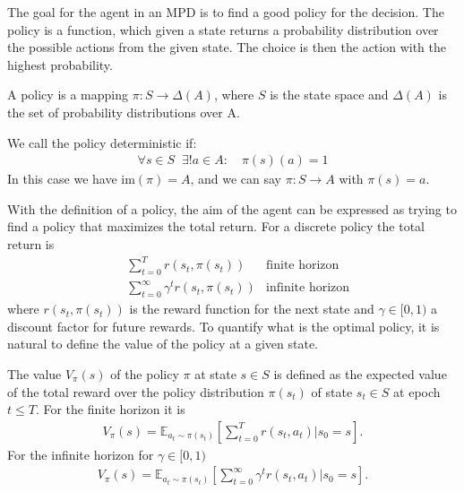 The goal for the agent in an MPD is to find a good policy for the decision.
The policy is a function, which given a state returns a probability
distribution over the possible actions from the given state. The choice is
then the action with the highest probability.
\begin{definition}[Policy]
    A policy is a mapping $\pi : S \to \Delta\left( A \right)$, where $S$ is
    the state space and $\Delta(A)$ is the set of probability distributions
    over A.
    \newline

    We call the policy deterministic if:
    \begin{align}
        \forall s \in S\;\; \exists !  a\in A:\quad \pi(s)(a) = 1
    \end{align}
    In this case we have $\text{im}(\pi) = A$, and we can say $\pi: S \to A$ with
    $\pi(s) = a$.
\end{definition}
With the definition of a policy, the aim of the agent can be expressed as
trying to find a policy that maximizes the total return. For a discrete
policy the total return is
\begin{align}
    &\sum_{t=0}^{T} r(s_t, \pi(s_t)) & \text{finite horizon}\\
    &\sum_{t=0}^{\infty}\gamma^{t} r(s_t, \pi(s_t)) & \text{infinite horizon}
\end{align}
where $r(s_t, \pi(s_t))$ is the reward function for the next state and
$\gamma \in [0, 1)$ a discount factor for future rewards.
\newline
To quantify what is the optimal policy, it is natural to define the value of the
policy at a given state.
\begin{definition}
    The value $V_\pi(s)$ of the policy $\pi$ at state $s \in S$ is defined as
    the expected value of the total reward over the policy distribution
    $\pi(s_t)$ of state $s_t \in S$ at epoch $t \le T$. For the finite horizon
    it is
    \begin{align}
        V_\pi(s) = \mathbb{E}_{a_t\sim\pi(s_t)}\left[\sum_{t=0}^{T}r(s_t,
        a_t) \Bigg| s_0 = s \right].
    \end{align}
    For the infinite horizon for $\gamma \in [0, 1)$
    \begin{align}
        V_\pi(s) =
        \mathbb{E}_{a_t\sim\pi(s_t)}\left[\sum_{t=0}^{\infty}\gamma^{t} r(s_t,
        a_t) \Bigg| s_0 = s \right].
    \end{align}
\end{definition}
